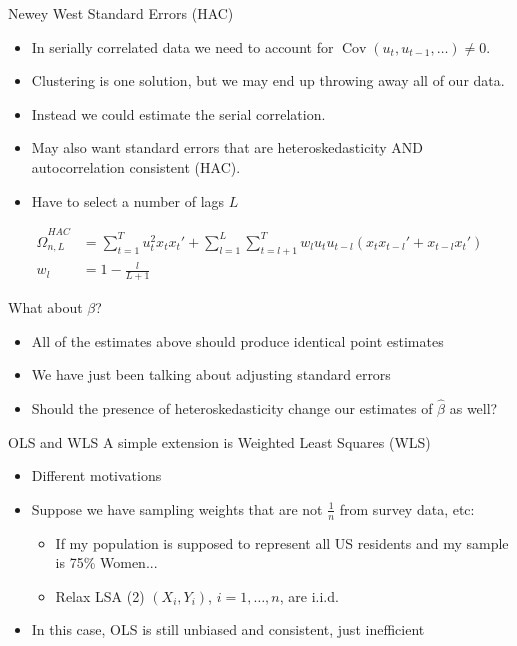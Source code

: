 \documentclass[aspectratio=169,11pt]{beamer}
\begin{document}
\begin{frame}{Newey West Standard Errors (HAC)}
\begin{itemize}
\item In serially correlated data we need to account for $\operatorname{ Cov } (u_{t},u_{t-1},\ldots ) \neq 0$.
\item Clustering is one solution, but we may end up throwing away all of our data.
\item Instead we could estimate the serial correlation.
\item May also want standard errors that are \alert{heteroskedasticity AND autocorrelation consistent} (HAC).
\item Have to select a number of lags $L$
\end{itemize}
\begin{align*}
\widehat { \Omega } _ { n,L }^{HAC} &= \sum _ { t = 1 } ^ { T }  u _ { t }^2 x_t x_t'  + \sum_{l=1}^L \sum _ { t = l+1 } ^ { T } w_l u_t u _ { t-l } \left( x_t x_{t-l}' +  x_{t-l} x_{t}'  \right)\\
w_l &= 1 - \frac{l}{L+1}
\end{align*}
\end{frame}




\begin{frame}{What about $\beta$?}
\begin{itemize}
\item All of the estimates above should produce \alert{identical} point estimates
\item We have just been talking about adjusting \alert{standard errors}
\item Should the presence of heteroskedasticity change our estimates of $\widehat{\beta}$ as well?
\end{itemize}
\end{frame}



\begin{frame}{OLS and WLS}
A simple extension is Weighted Least Squares (WLS)
\begin{itemize}
\item Different motivations
\item Suppose we have sampling weights that are not $\frac{1}{n}$ from survey data, etc:
    \begin{itemize}
    \item If my population is supposed to represent all US residents and my sample is 75\% Women...
    \item Relax LSA (2) $(X_i,Y_i)$, $i =1,\ldots,n$, are i.i.d.
\end{itemize}
\item In this case, OLS is still unbiased and consistent, just \alert{inefficient}
\end{itemize}
\end{frame}
\end{document}
